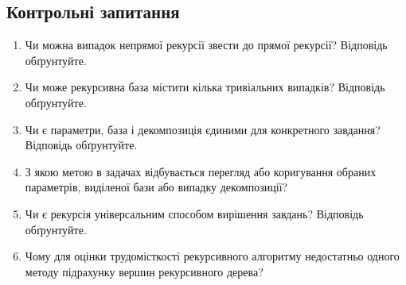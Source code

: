 \subsection*{Контрольні запитання}
\nopagebreak[4]
\begin{enumerate}
\item Чи можна випадок непрямої рекурсії звести до прямої рекурсії? Відповідь обґрунтуйте.
\item Чи може рекурсивна база містити кілька тривіальних випадків? Відповідь обґрунтуйте.
\item Чи є параметри, база і декомпозиція єдиними для конкретного завдання? Відповідь обґрунтуйте.
\item З якою метою в задачах відбувається перегляд або коригування обраних параметрів, виділеної бази або випадку декомпозиції?
\item Чи є рекурсія універсальним способом вирішення завдань? Відповідь обґрунтуйте.
\item Чому для оцінки трудомісткості рекурсивного алгоритму недостатньо одного методу підрахунку вершин рекурсивного дерева?


\end{enumerate}



